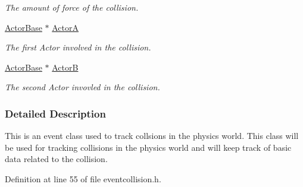 \begin{DoxyCompactItemize}
\begin{DoxyCompactList}\small\item\em The amount of force of the collision. \item\end{DoxyCompactList}\item 
\hypertarget{classphys_1_1EventCollision_a2de905d0332c66293cbe990fe2dbbb07}{
\hyperlink{classphys_1_1ActorBase}{ActorBase} $\ast$ \hyperlink{classphys_1_1EventCollision_a2de905d0332c66293cbe990fe2dbbb07}{ActorA}}
\label{classphys_1_1EventCollision_a2de905d0332c66293cbe990fe2dbbb07}

\begin{DoxyCompactList}\small\item\em The first Actor involved in the collision. \item\end{DoxyCompactList}\item 
\hypertarget{classphys_1_1EventCollision_a922fd42b74db6df7a59cb5fd54cbadbe}{
\hyperlink{classphys_1_1ActorBase}{ActorBase} $\ast$ \hyperlink{classphys_1_1EventCollision_a922fd42b74db6df7a59cb5fd54cbadbe}{ActorB}}
\label{classphys_1_1EventCollision_a922fd42b74db6df7a59cb5fd54cbadbe}

\begin{DoxyCompactList}\small\item\em The second Actor invovled in the collision. \item\end{DoxyCompactList}\end{DoxyCompactItemize}


\subsubsection{Detailed Description}
This is an event class used to track collsions in the physics world. This class will be used for tracking collisions in the physics world and will keep track of basic data related to the collision. 

Definition at line 55 of file eventcollision.h.



